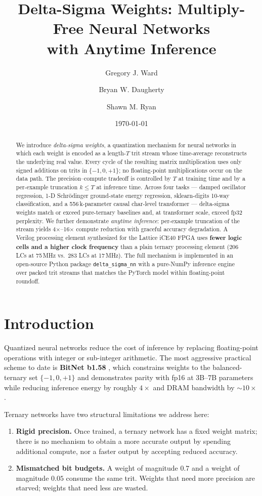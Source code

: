 \documentclass[11pt]{article}
\title{Delta-Sigma Weights: Multiply-Free Neural Networks\\with Anytime Inference}
\author[1]{Gregory J. Ward}
\author[1]{Bryan W. Daugherty}
\author[1]{Shawn M. Ryan}
\affil[1]{SmartLedger.Technology \\ \texttt{codenlighten1@gmail.com}}
\date{\today}
\begin{document}
\maketitle

\begin{abstract}
We introduce \emph{delta-sigma weights}, a quantization mechanism for
neural networks in which each weight is encoded as a length-$T$ trit
stream whose time-average reconstructs the underlying real value.
Every cycle of the resulting matrix multiplication uses only signed
additions on trits in $\{-1, 0, +1\}$; no floating-point
multiplications occur on the data path. The precision--compute
tradeoff is controlled by $T$ at training time and by a per-example
truncation $k \le T$ at inference time. Across four tasks --- damped
oscillator regression, 1-D Schr\"odinger ground-state energy
regression, sklearn-digits 10-way classification, and a
556\,k-parameter causal char-level transformer --- delta-sigma weights
match or exceed pure-ternary baselines and, at transformer scale,
exceed fp32 perplexity. We further demonstrate \emph{anytime
inference}: per-example truncation of the stream yields
4$\times$--16$\times$ compute reduction with graceful accuracy
degradation. A Verilog processing element synthesized for the Lattice
iCE40 FPGA uses \textbf{fewer logic cells and a higher clock
frequency} than a plain ternary processing element (206 LCs at 75\,MHz
vs.\ 283 LCs at 17\,MHz). The full mechanism is implemented in an
open-source Python package \texttt{delta\_sigma\_nn} with a
pure-NumPy inference engine over packed trit streams that matches the
PyTorch model within floating-point roundoff.
\end{abstract}

\section{Introduction}

Quantized neural networks reduce the cost of inference by replacing
floating-point operations with integer or sub-integer arithmetic. The
most aggressive practical scheme to date is \textbf{BitNet b1.58}
\citep{ma2024bitnet}, which constrains weights to the balanced-ternary
set $\{-1, 0, +1\}$ and demonstrates parity with fp16 at 3B--7B
parameters while reducing inference energy by roughly $4\times$ and
DRAM bandwidth by $\sim$$10\times$.

Ternary networks have two structural limitations we address here:

\begin{enumerate}
  \item \textbf{Rigid precision.} Once trained, a ternary network has
    a fixed weight matrix; there is no mechanism to obtain a more
    accurate output by spending additional compute, nor a faster output
    by accepting reduced accuracy.
  \item \textbf{Mismatched bit budgets.} A weight of magnitude $0.7$
    and a weight of magnitude $0.05$ consume the same trit. Weights
    that need more precision are starved; weights that need less are
    wasted.
\end{enumerate}
\end{document}
